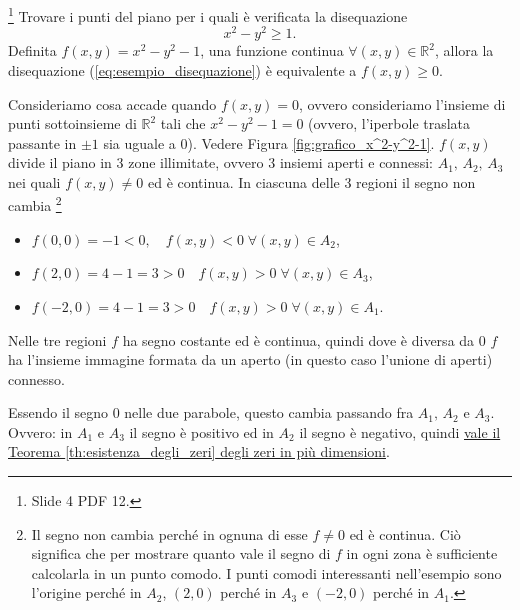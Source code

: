 \begin{example}\footnote{Slide 4 PDF 12.}
    Trovare i punti del piano per i quali  è verificata la disequazione
    \begin{equation}\label{eq:esempio_disequazione}
        x^2-y^2\geq 1.
    \end{equation}
    Definita $f(x,y)=x^2-y^2-1$, una funzione continua $\forall(x,y)\in\mathbb R^2$, allora la disequazione (\ref{eq:esempio_disequazione}) è equivalente a $f(x,y)\geq 0$.
    
    Consideriamo cosa accade quando $f(x,y)=0$, ovvero consideriamo l'insieme di punti sottoinsieme di $\mathbb R^2$ tali che $x^2-y^2-1=0$ (ovvero, l'iperbole traslata passante in $\pm 1$ sia uguale a 0).
    Vedere Figura \ref{fig:grafico_x^2-y^2-1}. $f(x,y)$ divide il piano in 3 zone illimitate, ovvero 3 insiemi aperti e connessi: $A_1,\, A_2,\, A_3$ nei quali $f(x,y)\neq 0$ ed è continua. In ciascuna delle 3 regioni il segno non cambia \footnote{Il segno non cambia perché in ognuna di esse $f\neq 0$ ed è continua. Ciò significa che per mostrare quanto vale il segno di $f$ in ogni zona è sufficiente calcolarla in un punto comodo. I punti comodi interessanti nell'esempio sono l'origine perché in $A_2$, $(2,0)$ perché in $A_3$ e $(-2,0)$ perché in $A_1$.}
    \begin{itemize}
        \item $f(0,0)=-1<0,\quad f(x,y)<0\;\forall (x,y)\in A_2$,
        \item $f(2,0)=4-1=3>0\quad f(x,y)>0\; \forall (x,y)\in A_3$,
        \item $f(-2,0)=4-1=3>0\quad f(x,y)>0\; \forall (x,y)\in A_1$.
    \end{itemize}
    
    Nelle tre regioni $f$ ha segno costante ed è continua, quindi dove è diversa da 0 $f$ ha l'insieme immagine formata da un aperto (in questo caso l'unione di aperti) connesso.

    Essendo il segno 0 nelle due parabole, questo cambia passando fra $A_1,\, A_2$ e $A_3$. Ovvero: in $A_1$ e $A_3$ il segno è positivo ed in $A_2$ il segno è negativo, quindi \uline{vale il Teorema \ref{th:esistenza_degli_zeri} degli zeri in più dimensioni}.
    
    \begin{figure}
    \centering
\end{figure}
\end{example}

